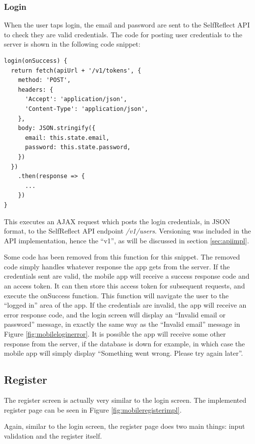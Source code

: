 \documentclass[11pt,openright,a4paper]{report}
\begin{document}
\subsubsection{Login}
When the user taps login, the email and password are sent to the SelfReflect API to check they are valid credentials. The code for posting user credentials to the server is shown in the following code snippet:
\begin{lstlisting}
login(onSuccess) {
  return fetch(apiUrl + '/v1/tokens', {
    method: 'POST',
    headers: {
      'Accept': 'application/json',
      'Content-Type': 'application/json',
    },
    body: JSON.stringify({
      email: this.state.email,
      password: this.state.password,
    })
  })
    .then(response => {
      ...
    })
}
\end{lstlisting}

This executes an AJAX request which posts the login credentials, in JSON format, to the SelfReflect API endpoint \emph{/v1/users}. Versioning was included in the API implementation, hence the \enquote{v1}, as will be discussed in section \ref{sec:apiimpl}.

Some code has been removed from this function for this snippet. The removed code simply handles whatever response the app gets from the server. If the credentials sent are valid, the mobile app will receive a success response code and an access token. It can then store this access token for subsequent requests, and execute the onSuccess function. This function will navigate the user to the \enquote{logged in} area of the app. If the credentials are invalid, the app will receive an error response code, and the login screen will display an \enquote{Invalid email or password} message, in exactly the same way as the \enquote{Invalid email} message in Figure \ref{fig:mobileloginerror}. It is possible the app will receive some other response from the server, if the database is down for example, in which case the mobile app will simply display \enquote{Something went wrong. Please try again later}.

\subsection{Register}
The register screen is actually very similar to the login screen. The implemented register page can be seen in Figure \ref{fig:mobileregisterimpl}.

Again, similar to the login screen, the register page does two main things: input validation and the register itself.
\end{document}
